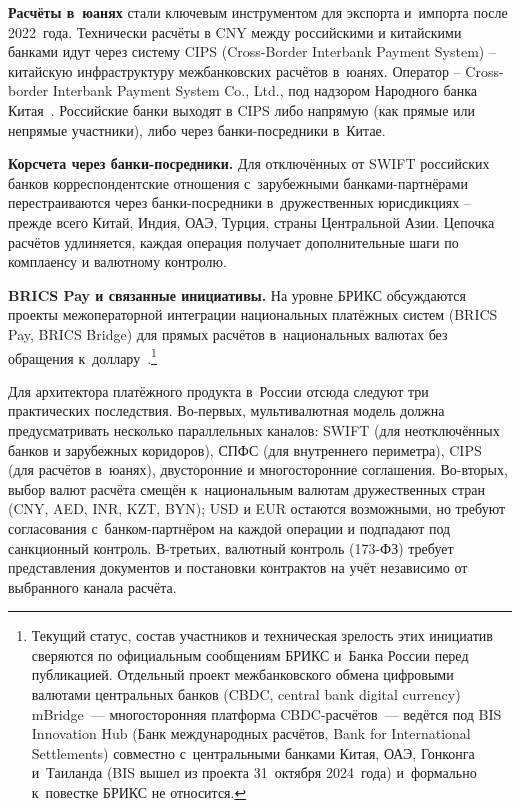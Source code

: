 \textbf{Расчёты в~юанях} стали ключевым инструментом
для экспорта и~импорта после 2022~года.
Технически расчёты в CNY между российскими и китайскими
банками идут через систему CIPS (Cross-Border Interbank
Payment System) -- китайскую инфраструктуру межбанковских
расчётов в~юанях. Оператор -- Cross-border Interbank Payment
System Co., Ltd., под надзором Народного банка
Китая~\cite{cips-overview}. Российские банки
выходят в CIPS либо напрямую (как прямые или непрямые участники),
либо через банки-посредники в~Китае.

\textbf{Корсчета через банки-посредники.} Для отключённых
от SWIFT российских банков корреспондентские отношения
с~зарубежными банками-партнёрами перестраиваются через
банки-посредники в~дружественных юрисдикциях -- прежде всего
Китай, Индия, ОАЭ, Турция, страны Центральной Азии. Цепочка
расчётов удлиняется, каждая операция получает дополнительные
шаги по комплаенсу и валютному контролю.

\textbf{BRICS Pay и связанные инициативы.} На уровне
БРИКС обсуждаются проекты межоператорной интеграции
национальных платёжных систем (BRICS Pay, BRICS Bridge)
для прямых расчётов в~национальных валютах без обращения
к~доллару~\cite{brics-pay-overview}.\footnote{Текущий статус,
состав участников и техническая зрелость этих инициатив
сверяются по официальным сообщениям БРИКС и~Банка России перед
публикацией. Отдельный проект межбанковского обмена цифровыми
валютами центральных банков (CBDC, central bank digital
currency) mBridge~--- многосторонняя платформа CBDC-расчётов~---
ведётся под BIS Innovation Hub (Банк международных расчётов,
Bank for International Settlements) совместно с~центральными
банками Китая, ОАЭ, Гонконга и~Таиланда (BIS вышел из проекта
31~октября 2024~года) и~формально к~повестке БРИКС не относится.}

Для архитектора платёжного продукта в~России отсюда
следуют три практических последствия. Во-первых, мультивалютная
модель должна предусматривать несколько параллельных каналов:
SWIFT (для неотключённых банков и зарубежных коридоров), СПФС
(для внутреннего периметра), CIPS (для расчётов в~юанях),
двусторонние и многосторонние соглашения. Во-вторых,
выбор валют расчёта смещён к~национальным валютам
дружественных стран (CNY, AED, INR, KZT, BYN); USD и EUR
остаются возможными, но требуют согласования с~банком-партнёром
на каждой операции и подпадают под санкционный контроль.
В-третьих, валютный контроль (173-ФЗ) требует представления
документов и постановки контрактов на учёт независимо
от выбранного канала расчёта.


